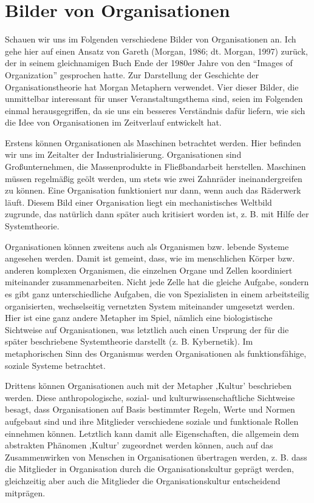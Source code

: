\documentclass[
  letterpaper,
]{book}
\begin{document}
\section{Bilder von Organisationen}\label{bilder-von-organisationen}

Schauen wir uns im Folgenden verschiedene Bilder von Organisationen an.
Ich gehe hier auf einen Ansatz von Gareth (Morgan, 1986; dt. Morgan,
1997) zurück, der in seinem gleichnamigen Buch Ende der 1980er Jahre von
den ``Images of Organization'' gesprochen hatte. Zur Darstellung der
Geschichte der Organisationstheorie hat Morgan Metaphern verwendet. Vier
dieser Bilder, die unmittelbar interessant für unser Veranstaltungsthema
sind, seien im Folgenden einmal herausgegriffen, da sie uns ein besseres
Verständnis dafür liefern, wie sich die Idee von Organisationen im
Zeitverlauf entwickelt hat.

Erstens können Organisationen als Maschinen betrachtet werden. Hier
befinden wir uns im Zeitalter der Industrialisierung. Organisationen
sind Großunternehmen, die Massenprodukte in Fließbandarbeit herstellen.
Maschinen müssen regelmäßig geölt werden, um stets wie zwei Zahnräder
ineinandergreifen zu können. Eine Organisation funktioniert nur dann,
wenn auch das Räderwerk läuft. Diesem Bild einer Organisation liegt ein
mechanistisches Weltbild zugrunde, das natürlich dann später auch
kritisiert worden ist, z. B. mit Hilfe der Systemtheorie.

Organisationen können zweitens auch als Organismen bzw. lebende Systeme
angesehen werden. Damit ist gemeint, dass, wie im menschlichen Körper
bzw. anderen komplexen Organismen, die einzelnen Organe und Zellen
koordiniert miteinander zusammenarbeiten. Nicht jede Zelle hat die
gleiche Aufgabe, sondern es gibt ganz unterschiedliche Aufgaben, die von
Spezialisten in einem arbeitsteilig organisierten, wechselseitig
vernetzten System miteinander umgesetzt werden. Hier ist eine ganz
andere Metapher im Spiel, nämlich eine biologistische Sichtweise auf
Organisationen, was letztlich auch einen Ursprung der für die später
beschriebene Systemtheorie darstellt (z. B. Kybernetik). Im
metaphorischen Sinn des Organismus werden Organisationen als
funktionsfähige, soziale Systeme betrachtet.

Drittens können Organisationen auch mit der Metapher ‚Kultur'
beschrieben werden. Diese anthropologische, sozial- und
kulturwissenschaftliche Sichtweise besagt, dass Organisationen auf Basis
bestimmter Regeln, Werte und Normen aufgebaut sind und ihre Mitglieder
verschiedene soziale und funktionale Rollen einnehmen können. Letztlich
kann damit alle Eigenschaften, die allgemein dem abstrakten Phänomen
‚Kultur' zugeordnet werden können, auch auf das Zusammenwirken von
Menschen in Organisationen übertragen werden, z. B. dass die Mitglieder
in Organisation durch die Organisationskultur geprägt werden,
gleichzeitig aber auch die Mitglieder die Organisationskultur
entscheidend mitprägen.
\end{document}
